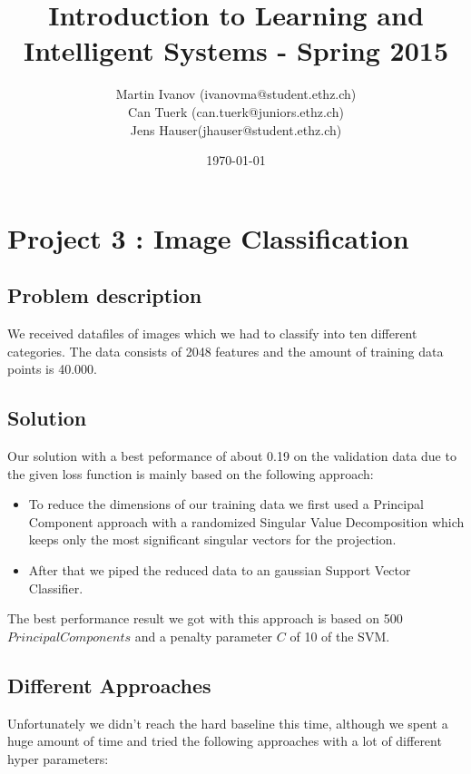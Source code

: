 \documentclass[a4paper, 11pt]{article}
\title{Introduction to Learning and Intelligent Systems - Spring 2015}
\author{Martin Ivanov (ivanovma@student.ethz.ch)\\ Can Tuerk (can.tuerk@juniors.ethz.ch)\\ Jens Hauser(jhauser@student.ethz.ch)\\}
\date{\today}
\begin{document}
\maketitle

\section*{Project 3 : Image Classification}

\subsection*{Problem description}
We received datafiles of images which we had to classify into ten different categories. The data consists of 2048 features and the amount of training data points is 40.000.

\subsection*{Solution}
Our solution with a best peformance of about 0.19 on the validation data due to the given loss function is mainly based on the following approach:

\begin{itemize}

\item To reduce the dimensions of our training data we first used a Principal Component approach with a randomized Singular Value Decomposition which keeps only the most significant singular vectors for the projection.

\item After that we piped the reduced data to an gaussian Support Vector Classifier.
\end{itemize}

The best performance result we got with this approach is based on 500 $Principal Components$ and a penalty parameter $C$ of 10 of the SVM.


\newpage

\subsection*{Different Approaches}
Unfortunately we didn't reach the hard baseline this time, although we spent a huge amount of time and tried the following approaches with a lot of different hyper parameters:
\end{document}

